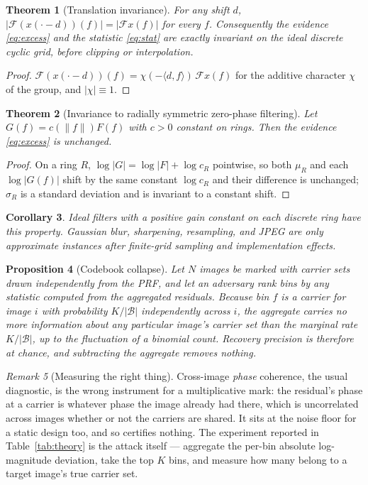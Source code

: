 \documentclass[10pt,twocolumn]{article}
\newtheorem{theorem}{Theorem}
\newtheorem{proposition}[theorem]{Proposition}
\newtheorem{corollary}[theorem]{Corollary}
\theoremstyle{definition}
\theoremstyle{remark}
\newtheorem{remark}[theorem]{Remark}
\begin{document}
\begin{theorem}[Translation invariance]
\label{thm:translation}
For any shift $d$, $|\mathcal{F}(x(\cdot-d))(f)| = |\mathcal{F}x(f)|$ for every
$f$. Consequently the evidence \eqref{eq:excess} and the statistic
\eqref{eq:stat} are exactly invariant on the ideal discrete cyclic grid,
before clipping or interpolation.
\end{theorem}
\begin{proof}
$\mathcal{F}(x(\cdot-d))(f) = \chi(-\langle d,f\rangle)\,\mathcal{F}x(f)$ for the
additive character $\chi$ of the group, and $|\chi|\equiv1$.
\end{proof}

\begin{theorem}[Invariance to radially symmetric zero-phase filtering]
\label{thm:filter}
Let $G(f)=c(\lVert f\rVert)F(f)$ with $c>0$ constant on rings. Then the evidence
\eqref{eq:excess} is unchanged.
\end{theorem}
\begin{proof}
On a ring $R$, $\log|G| = \log|F| + \log c_R$ pointwise, so both $\mu_R$ and each
$\log|G(f)|$ shift by the same constant $\log c_R$ and their difference is
unchanged; $\sigma_R$ is a standard deviation and is invariant to a constant
shift.
\end{proof}

\begin{corollary}
Ideal filters with a positive gain constant on each discrete ring have this
property. Gaussian blur, sharpening, resampling, and JPEG are only approximate
instances after finite-grid sampling and implementation effects.
\end{corollary}

\begin{proposition}[Codebook collapse]
\label{prop:codebook}
Let $N$ images be marked with carrier sets drawn independently from the PRF, and
let an adversary rank bins by any statistic computed from the aggregated
residuals. Because bin $f$ is a carrier for image $i$ with probability
$K/|\mathcal{B}|$ independently across $i$, the aggregate carries no more
information about any particular image's carrier set than the marginal rate
$K/|\mathcal{B}|$, up to the fluctuation of a binomial count. Recovery precision
is therefore at chance, and subtracting the aggregate removes nothing.
\end{proposition}

\begin{remark}[Measuring the right thing]
Cross-image \emph{phase} coherence, the usual diagnostic, is the wrong
instrument for a multiplicative mark: the residual's phase at a carrier is
whatever phase the image already had there, which is uncorrelated across images
whether or not the carriers are shared. It sits at the noise floor for a static
design too, and so certifies nothing. The experiment reported in
Table~\ref{tab:theory} is the attack itself --- aggregate the per-bin absolute
log-magnitude deviation, take the top $K$ bins, and measure how many belong to a
target image's true carrier set.
\end{remark}
\end{document}
